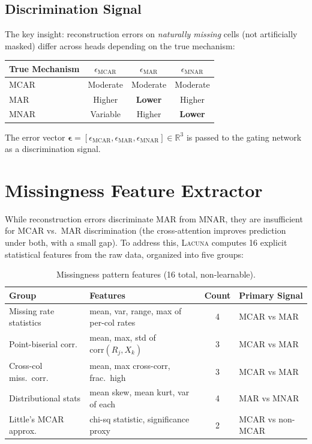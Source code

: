 \documentclass[11pt]{article}
\newcommand{\RR}{\mathbb{R}}
\newcommand{\lacuna}{\textsc{Lacuna}}
\begin{document}
\subsection{Discrimination Signal}

The key insight: reconstruction errors on \emph{naturally missing} cells (not artificially masked) differ across heads depending on the true mechanism:

\begin{center}
\begin{tabular}{lccc}
\toprule
\textbf{True Mechanism} & $\epsilon_{\text{MCAR}}$ & $\epsilon_{\text{MAR}}$ & $\epsilon_{\text{MNAR}}$ \\
\midrule
MCAR & Moderate & Moderate & Moderate \\
MAR & Higher & \textbf{Lower} & Higher \\
MNAR & Variable & Higher & \textbf{Lower} \\
\bottomrule
\end{tabular}
\end{center}

The error vector $\bm{\epsilon} = [\epsilon_{\text{MCAR}}, \epsilon_{\text{MAR}}, \epsilon_{\text{MNAR}}] \in \RR^3$ is passed to the gating network as a discrimination signal.

\section{Missingness Feature Extractor}
\label{sec:missingness_features}

While reconstruction errors discriminate MAR from MNAR, they are insufficient for MCAR vs.\ MAR discrimination (the cross-attention improves prediction under both, with a small gap). To address this, \lacuna{} computes 16 explicit statistical features from the raw data, organized into five groups:

\begin{table}[h]
\centering
\caption{Missingness pattern features (16 total, non-learnable).}
\label{tab:miss_features}
\begin{tabular}{llcl}
\toprule
\textbf{Group} & \textbf{Features} & \textbf{Count} & \textbf{Primary Signal} \\
\midrule
Missing rate statistics & mean, var, range, max of per-col rates & 4 & MCAR vs MAR \\
Point-biserial corr. & mean, max, std of $\text{corr}(R_j, X_k)$ & 3 & MCAR vs MAR \\
Cross-col miss.\ corr. & mean, max cross-corr, frac.\ high & 3 & MCAR vs MAR \\
Distributional stats & mean skew, mean kurt, var of each & 4 & MAR vs MNAR \\
Little's MCAR approx. & chi-sq statistic, significance proxy & 2 & MCAR vs non-MCAR \\
\bottomrule
\end{tabular}
\end{table}
\end{document}

